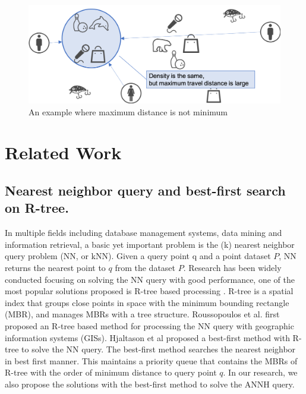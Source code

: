 \documentclass[a4paper,11pt]{report}
\theoremstyle{mytheoremstyle}
\begin{document}
\begin{figure}
\includegraphics[width=\textwidth]{images/example-max2.png}
\caption{An example where maximum distance is not minimum} \label{fig:example-max2}
\end{figure}


\chapter{Related Work}
\label{section:related-works}

\section{Nearest neighbor query and best-first search on R-tree.}
In multiple fields including database management systems, data mining and information retrieval, a basic yet important problem is the (k) nearest neighbor query problem (NN, or kNN). Given a query point q and a point dataset $P$, NN returns the nearest point to $q$ from the dataset $P$. Research has been widely conducted focusing on solving the NN query with good performance, one of the most popular solutions proposed is R-tree based processing \cite{NN,cheung1998enhanced,hjaltason1999distance}. R-tree \cite{R-tree} is a spatial index that groups close points in space with the minimum bounding rectangle (MBR), and manages MBRs with a tree structure. Roussopoulos et al. \cite{NN} first proposed an R-tree based method for processing the NN query with geographic information systems (GISs). Hjaltason et al \cite{hjaltason1999distance} proposed a best-first method with R-tree to solve the NN query. The best-first method searches the nearest neighbor in best first manner. This maintains a priority queue that contains the MBRs of R-tree with the order of minimum distance to query point $q$. In our research, we also propose the solutions with the best-first method to solve the ANNH query.
\end{document}
